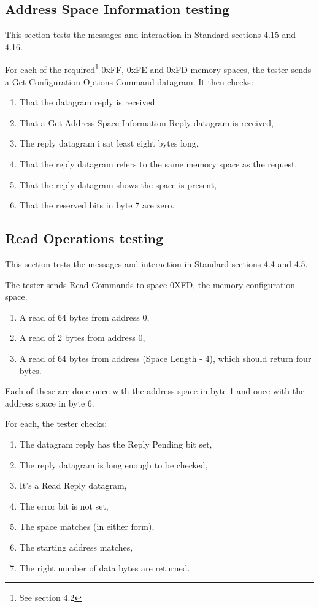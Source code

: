 \documentclass[11pt]{article}
\begin{document}
\subsection{Address Space Information testing}

This section tests the messages and interaction in Standard sections 4.15 and 4.16.

For each of the required\footnote{See section 4.2}
0xFF, 0xFE and 0xFD memory spaces, the
tester sends a Get Configuration Options Command datagram.  It then checks:
\begin{enumerate}
\item That the datagram reply is received.
\item That a Get Address Space Information Reply datagram is received,
\item The reply datagram i sat least eight bytes long,
\item That the reply datagram refers to the same memory space as the request,
\item That the reply datagram shows the space is present,
\item That the reserved bits in byte 7 are zero.
\end{enumerate}

\subsection{Read Operations testing}

This section tests the messages and interaction in Standard sections 4.4 and 4.5.

The tester sends Read Commands to space 0XFD, the memory configuration space.

\begin{enumerate}
\item A read of 64 bytes from address 0,
\item A read of 2 bytes from address 0,
\item A read of 64 bytes from address (Space Length - 4), which should return four bytes.
\end{enumerate}

Each of these are done once with the address space in byte 1 
and once with the address space in byte 6.

For each, the tester checks:
\begin{enumerate}
\item The datagram reply has the Reply Pending bit set,
\item The reply datagram is long enough to be checked,
\item It's a Read Reply datagram,
\item The error bit is not set,
\item The space matches (in either form),
\item The starting address matches,
\item The right number of data bytes are returned.
\end{enumerate}
\end{document}
